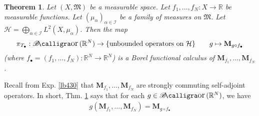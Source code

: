 \documentclass[12pt,b5paper,notitlepage]{article}
\theoremstyle{definition}
\theoremstyle{plain}
\newtheorem{thm}[df]{Theorem}
\DeclareMathOperator{\Bor}{\mathscr{B}\text{\kern -2pt {\calligra\large or}}\,}
\newcommand{\fk}{\mathfrak}
\newcommand{\blt}{\bullet}
\newcommand{\Rbb}{\mathbb R}
\newcommand{\MH}{\mathcal H}
\newcommand{\SI}{\mathscr I}
\newcommand{\Mbf}{\mathbf M}
\numberwithin{equation}{section}
\begin{document}
\begin{thm}\label{lb435}
Let $(X,\fk M)$ be a measurable space. Let $f_1,\dots,f_N:X\rightarrow\Rbb$ be measurable functions. Let $(\mu_\alpha)_{\alpha\in\SI}$ be a family of measures on $\fk M$. Let $\MH=\bigoplus_{\alpha\in\SI}L^2(X,\mu_\alpha)$. Then the map
\begin{align}
\pi_{T_\blt}:\Bor(\Rbb^N)\rightarrow\{\text{unbounded operators on }\MH\}\qquad g\mapsto \Mbf_{g\circ f_\blt}
\end{align}
(where $f_\blt=(f_1,\dots,f_N):\Rbb^N\rightarrow\Rbb^N$) is a Borel functional calculus of $\Mbf_{f_1},\dots,\Mbf_{f_N}$.
\end{thm}


Recall from Exp. \ref{lb430} that $\Mbf_{f_1},\dots,\Mbf_{f_N}$ are strongly commuting self-adjoint operators. In short, Thm. \ref{lb435} says that for each $g\in\Bor(\Rbb^N)$, we have
\begin{align*}
g(\Mbf_{f_1},\dots,\Mbf_{f_N})=\Mbf_{g\circ f_\blt}
\end{align*}
\end{document}
